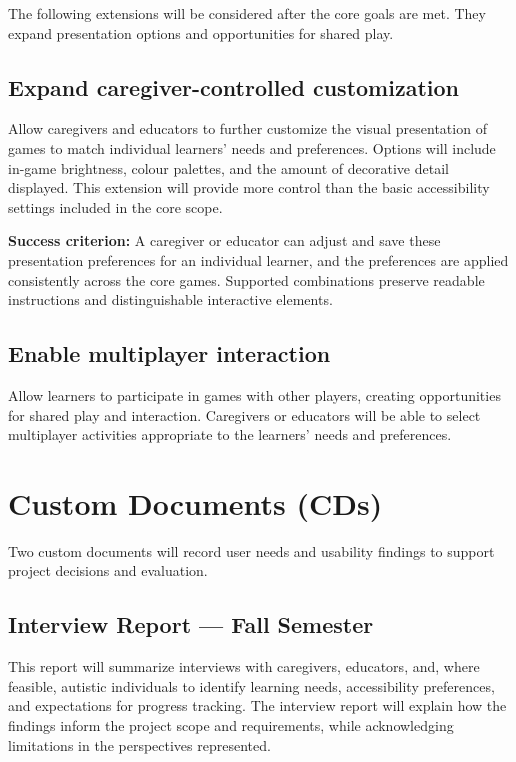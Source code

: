 \documentclass{article}
\begin{document}
The following extensions will be considered after the core goals are met.
They expand presentation options and opportunities for shared play.

\subsection{Expand caregiver-controlled customization}

Allow caregivers and educators to further customize the visual
presentation of games to match individual learners' needs and
preferences. Options will include in-game brightness, colour palettes,
and the amount of decorative detail displayed. This extension will
provide more control than the basic accessibility settings included
in the core scope.

\textbf{Success criterion:} A caregiver or educator can adjust and save
these presentation preferences for an individual learner, and the
preferences are applied consistently across the core games. Supported
combinations preserve readable instructions and distinguishable
interactive elements.

\subsection{Enable multiplayer interaction}

Allow learners to participate in games with other players, creating
opportunities for shared play and interaction. Caregivers or educators
will be able to select multiplayer activities appropriate to the
learners' needs and preferences.

\section{Custom Documents (CDs)}

Two custom documents will record user needs and usability findings to support
project decisions and evaluation.

\subsection{Interview Report --- Fall Semester}

This report will summarize interviews with caregivers, educators, and,
where feasible, autistic individuals to identify learning needs,
accessibility preferences, and expectations for progress tracking.
The interview report will explain how the findings inform the project scope and
requirements, while acknowledging limitations in the perspectives
represented.
\end{document}
